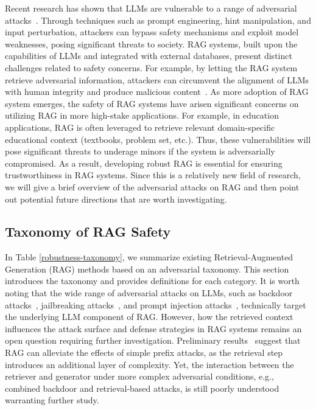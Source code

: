 \label{sec:robustness}

Recent research has shown that LLMs are vulnerable to a range of adversarial attacks~\cite{huang2023surveysafetytrustworthinesslarge, shayegani2023surveyvulnerabilitieslargelanguage, liu2024towards, Yao_2024}. Through techniques such as prompt engineering, hint manipulation, and input perturbation, attackers can bypass safety mechanisms and exploit model weaknesses, posing significant threats to society. RAG systems, built upon the capabilities of LLMs and integrated with external databases, present distinct challenges related to safety concerns. For example, by letting the RAG system retrieve adversarial information, attackers can circumvent the alignment of LLMs with human integrity and produce malicious content~\cite{deng2024pandorajailbreakgptsretrieval}. As more adoption of RAG system emerges, the safety of RAG systems have arisen significant concerns on utilizing RAG in more high-stake applications. For example, in education applications, RAG is often leveraged to retrieve relevant domain-specific educational context (textbooks, problem set, etc.). Thus, these vulnerabilities will pose significant threats to underage minors if the system is adversarially compromised. As a result, developing robust RAG is essential for ensuring trustworthiness in RAG systems. Since this is a relatively new field of research, we will give a brief overview of the adversarial attacks on RAG and then point out potential future directions that are worth investigating. 

\subsection{Taxonomy of RAG Safety} In Table \ref{robustness-taxonomy}, we summarize existing Retrieval-Augmented Generation (RAG) methods based on an adversarial taxonomy. This section introduces the taxonomy and provides definitions for each category. It is worth noting that the wide range of adversarial attacks on LLMs, such as backdoor attacks~\cite{xue2024trojllm, lu2024test}, jailbreaking attacks~\cite{wei2024jailbroken, zou2023universal}, and prompt injection attacks~\cite{greshake2023not, liu2023prompt, yan2023backdooring}, technically target the underlying LLM component of RAG. However, how the retrieved context influences the attack surface and defense strategies in RAG systems remains an open question requiring further investigation. Preliminary results~\cite{privacy_rag_2024} suggest that RAG can alleviate the effects of simple prefix attacks, as the retrieval step introduces an additional layer of complexity. Yet, the interaction between the retriever and generator %
under more complex adversarial conditions, e.g., combined backdoor and retrieval-based attacks, is still poorly understood warranting further study.

